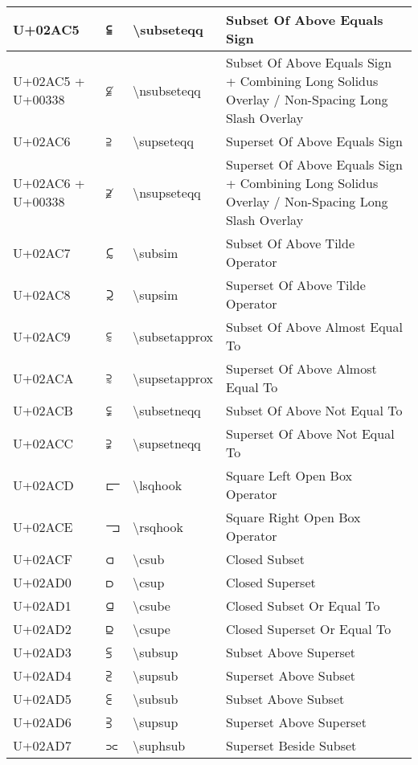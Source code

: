 \begin{table}[h]
\begin{tabulary}{\linewidth}{|L|L|L|L|}
\hline
U+02AC5 & ⫅ & {\textbackslash}subseteqq & Subset Of Above Equals Sign \\
\hline
U+02AC5 + U+00338 & ⫅̸ & {\textbackslash}nsubseteqq & Subset Of Above Equals Sign + Combining Long Solidus Overlay / Non-Spacing Long Slash Overlay \\
\hline
U+02AC6 & ⫆ & {\textbackslash}supseteqq & Superset Of Above Equals Sign \\
\hline
U+02AC6 + U+00338 & ⫆̸ & {\textbackslash}nsupseteqq & Superset Of Above Equals Sign + Combining Long Solidus Overlay / Non-Spacing Long Slash Overlay \\
\hline
U+02AC7 & ⫇ & {\textbackslash}subsim & Subset Of Above Tilde Operator \\
\hline
U+02AC8 & ⫈ & {\textbackslash}supsim & Superset Of Above Tilde Operator \\
\hline
U+02AC9 & ⫉ & {\textbackslash}subsetapprox & Subset Of Above Almost Equal To \\
\hline
U+02ACA & ⫊ & {\textbackslash}supsetapprox & Superset Of Above Almost Equal To \\
\hline
U+02ACB & ⫋ & {\textbackslash}subsetneqq & Subset Of Above Not Equal To \\
\hline
U+02ACC & ⫌ & {\textbackslash}supsetneqq & Superset Of Above Not Equal To \\
\hline
U+02ACD & ⫍ & {\textbackslash}lsqhook & Square Left Open Box Operator \\
\hline
U+02ACE & ⫎ & {\textbackslash}rsqhook & Square Right Open Box Operator \\
\hline
U+02ACF & ⫏ & {\textbackslash}csub & Closed Subset \\
\hline
U+02AD0 & ⫐ & {\textbackslash}csup & Closed Superset \\
\hline
U+02AD1 & ⫑ & {\textbackslash}csube & Closed Subset Or Equal To \\
\hline
U+02AD2 & ⫒ & {\textbackslash}csupe & Closed Superset Or Equal To \\
\hline
U+02AD3 & ⫓ & {\textbackslash}subsup & Subset Above Superset \\
\hline
U+02AD4 & ⫔ & {\textbackslash}supsub & Superset Above Subset \\
\hline
U+02AD5 & ⫕ & {\textbackslash}subsub & Subset Above Subset \\
\hline
U+02AD6 & ⫖ & {\textbackslash}supsup & Superset Above Superset \\
\hline
U+02AD7 & ⫗ & {\textbackslash}suphsub & Superset Beside Subset \\

\end{tabulary}
\end{table}
